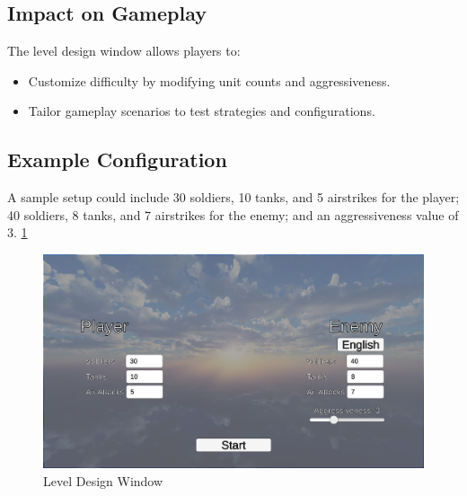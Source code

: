 \subsection{Impact on Gameplay}
The level design window allows players to:
\begin{itemize}
    \item Customize difficulty by modifying unit counts and aggressiveness.
    \item Tailor gameplay scenarios to test strategies and configurations.
\end{itemize}

\subsection{Example Configuration}
A sample setup could include 30 soldiers, 10 tanks, and 5 airstrikes for the player; 40 soldiers, 8 tanks, and 7 airstrikes for the enemy; and an aggressiveness value of 3. \ref{fig:level-design-window}
\begin{figure}[!htbp]
    \centering
    \includegraphics[width=1.0\linewidth]{image.png}
    \caption{Level Design Window}
    \label{fig:level-design-window}
\end{figure}





